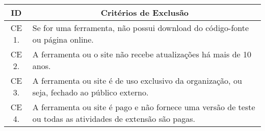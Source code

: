 \begin{table}[!htb]
  \centering
  \footnotesize
  \begin{tabular}{c|p{8cm}}
    \bottomrule
    \rowcolor[rgb]{0.753,0.753,0.753} \textbf{ID} & \multicolumn{1}{c}{\textbf{Critérios de Exclusão}}                                                           \\
    \hline
    \rowcolor[rgb]{0.898,0.898,0.898} CE 1.       & Se for uma ferramenta, não possui download do código-fonte ou página online.                               \\
    CE 2.                                         & A ferramenta ou o site não recebe atualizações há mais de 10 anos.                                  \\
    \rowcolor[rgb]{0.898,0.898,0.898} CE 3.       & A ferramenta ou site é de uso exclusivo da organização, ou seja, fechado ao público externo. \\
    CE 4.                                         & A ferramenta ou site é pago e não fornece uma versão de teste ou todas as atividades de extensão são pagas.     \\
    \toprule
  \end{tabular}
\end{table}